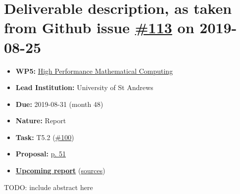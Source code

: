 \hypertarget{deliverable-description-as-taken-from-github-issue-113-on-2019-08-25}{%
\section*{\texorpdfstring{Deliverable description, as taken from Github
issue
\href{https://github.com/OpenDreamKit/OpenDreamKit/issues/113}{\#113} on
2019-08-25}{Deliverable description, as taken from Github issue \#113 on 2019-08-25}}\label{deliverable-description-as-taken-from-github-issue-113-on-2019-08-25}}

\begin{itemize}
\tightlist
\item
  \textbf{WP5:}
  \href{https://github.com/OpenDreamKit/OpenDreamKit/tree/master/WP5}{High
  Performance Mathematical Computing}
\item
  \textbf{Lead Institution:} University of St Andrews
\item
  \textbf{Due:} 2019-08-31 (month 48)
\item
  \textbf{Nature:} Report
\item
  \textbf{Task:} T5.2
  (\href{https://github.com/OpenDreamKit/OpenDreamKit/issues/100}{\#100})
\item
  \textbf{Proposal:}
  \href{https://github.com/OpenDreamKit/OpenDreamKit/raw/master/Proposal/proposal-www.pdf}{p.
  51}
\item
  \textbf{\href{https://github.com/OpenDreamKit/OpenDreamKit/raw/master/WP5/D5.15/report-final.pdf}{Upcoming
  report}}
  (\href{https://github.com/OpenDreamKit/OpenDreamKit/raw/master/WP5/D5.15/}{sources})
\end{itemize}

TODO: include abstract here
